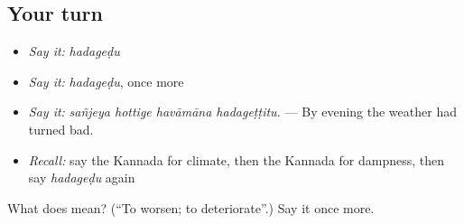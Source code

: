 \subsection*{Your turn}
\begin{itemize}
\raggedright
  \item \emph{Say it:} \emph{hadageḍu}
  \item \emph{Say it:} \emph{hadageḍu}, once more
  \item \emph{Say it:} \emph{sañjeya hottige havāmāna hadageṭṭitu.} — By evening the weather had turned bad.
  \item \emph{Recall:} say the Kannada for climate, then the Kannada for dampness, then say \emph{hadageḍu} again
\end{itemize}

\begin{tcolorbox}[breakable,colback=teal!4,colframe=teal!35!black,title={Before you move on}]
What does  mean? (\textquotedblleft{}To worsen; to deteriorate\textquotedblright{}.) Say it once more.
\end{tcolorbox}
